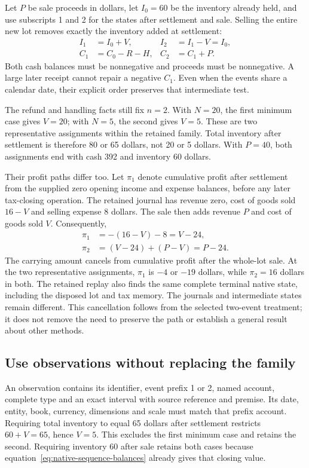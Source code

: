 Let \(P\) be sale proceeds in dollars, let \(I_0=60\) be the inventory already
held, and use subscripts 1 and 2 for the states after settlement and sale.
Selling the entire new lot removes exactly the inventory added at settlement:
\begin{align}
\label{eq:native-sequence-balances}
 I_1&=I_0+V, & I_2&=I_1-V=I_0,\\
 C_1&=C_0-R-H, & C_2&=C_1+P.
\end{align}
Both cash balances must be nonnegative and proceeds must be nonnegative.
A large later receipt cannot repair a negative \(C_1\). Even when the events
share a calendar date, their explicit order preserves that intermediate test.

The refund and handling facts still fix \(n=2\). With \(N=20\), the first
minimum case gives \(V=20\); with \(N=5\), the second gives \(V=5\).
These are two representative assignments within the retained family. Total
inventory after settlement is therefore 80 or 65 dollars, not 20 or 5 dollars.
With \(P=40\), both assignments end with cash 392 and inventory 60 dollars.

Their profit paths differ too. Let \(\pi_1\) denote cumulative profit after
settlement from the supplied zero opening income and expense balances, before
any later tax-closing operation. The retained journal has revenue zero,
cost of goods sold \(16-V\) and selling expense 8 dollars. The sale then
adds revenue \(P\) and cost of goods sold \(V\). Consequently,
\begin{align}
\label{eq:native-sequence-profit}
 \pi_1&=-(16-V)-8=V-24,\\
 \pi_2&=(V-24)+(P-V)=P-24.
\end{align}
The carrying amount cancels from cumulative profit after the whole-lot sale.
At the two representative assignments, \(\pi_1\) is \(-4\) or \(-19\)
dollars, while \(\pi_2=16\) dollars in both. The retained replay also finds
the same complete terminal native state, including the disposed lot and tax
memory. The journals and intermediate states remain different. This
cancellation follows from the selected two-event treatment; it does not remove
the need to preserve the path or establish a general result about other methods.

\subsection{Use observations without replacing the family}

An observation contains its identifier, event prefix 1 or 2, named account,
complete type and an exact interval with source reference and premise. Its date,
entity, book, currency, dimensions and scale must match that prefix account.
Requiring total inventory to equal 65 dollars after settlement restricts
\(60+V=65\), hence \(V=5\). This excludes the first minimum case and retains
the second. Requiring inventory 60 after sale retains both cases because
equation~\eqref{eq:native-sequence-balances} already gives that closing value.

